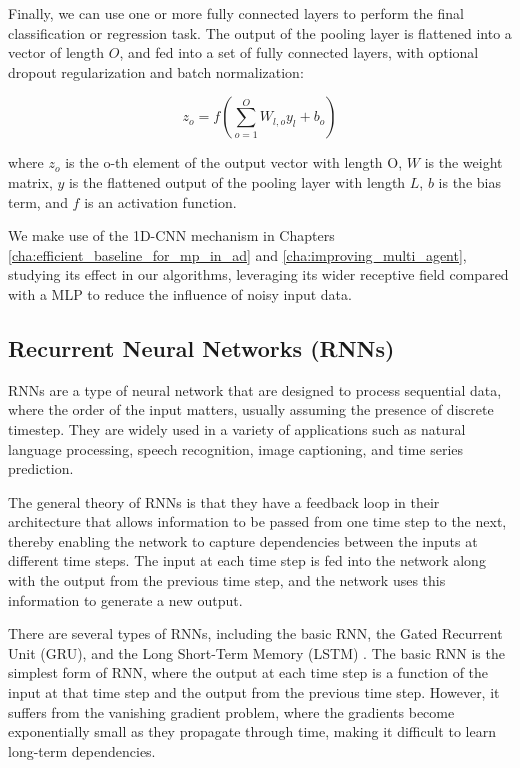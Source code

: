 Finally, we can use one or more fully connected layers to perform the final classification or regression task. The output of the pooling layer is flattened into a vector of length $O$, and fed into a set of fully connected layers, with optional dropout regularization and batch normalization:

\begin{equation}
	z_o = f(\sum_{o=1}^O W_{l,o} y_l + b_o)
\end{equation}

where $z_{o}$ is the o-th element of the output vector with length O, $W$ is the weight matrix, $y$ is the flattened output of the pooling layer with length $L$, $b$ is the bias term, and $f$ is an activation function. 

We make use of the 1D-\ac{CNN} mechanism in Chapters \ref{cha:efficient_baseline_for_mp_in_ad} and \ref{cha:improving_multi_agent}, studying its effect in our algorithms, leveraging its wider receptive field compared with a \ac{MLP} to reduce the influence of noisy input data. 

\subsection{Recurrent Neural Networks (RNNs)}
\label{subsec:3_rnns}

\acfp{RNN} are a type of neural network that are designed to process sequential data, where the order of the input matters, usually assuming the presence of discrete timestep. They are widely used in a variety of applications such as natural language processing, speech recognition, image captioning, and time series prediction.

The general theory of RNNs is that they have a feedback loop in their architecture that allows information to be passed from one time step to the next, thereby enabling the network to capture dependencies between the inputs at different time steps. The input at each time step is fed into the network along with the output from the previous time step, and the network uses this information to generate a new output.

There are several types of RNNs, including the basic RNN, the Gated Recurrent Unit (GRU), and the Long Short-Term Memory (LSTM) \cite{hochreiter1997long}. The basic RNN is the simplest form of RNN, where the output at each time step is a function of the input at that time step and the output from the previous time step. However, it suffers from the vanishing gradient problem, where the gradients become exponentially small as they propagate through time, making it difficult to learn long-term dependencies.

